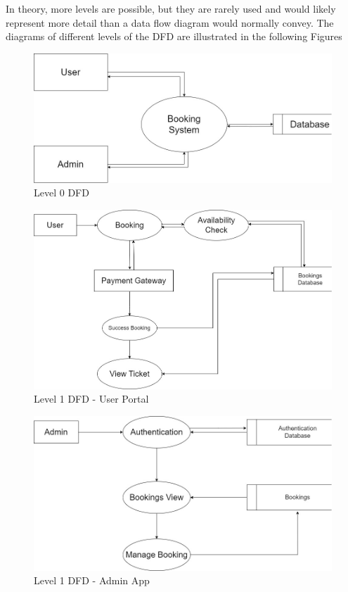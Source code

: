 \documentclass[12pt,a4paper]{report}
\begin{document}
In theory, more levels are possible, but they are rarely used and would likely represent more detail than a data flow diagram would normally convey. The diagrams of different levels of the DFD are illustrated in the following Figures
\begin{figure}[ht]
    \centering
    \includegraphics[width=\textwidth]{assets/DFD-1.jpg}
    \caption{Level 0 DFD}
    \label{dfd-1}
\end{figure}

\begin{figure}
    \centering
    \includegraphics[width=\textwidth]{assets/DFD-2-User.jpg}
    \caption{Level 1 DFD - User Portal}
    \label{dfd-2-user}
\end{figure}

\begin{figure}
    \centering
    \includegraphics[width=\textwidth]{assets/DFD-2-Admin.jpg}
    \caption{Level 1 DFD - Admin App}
    \label{dfd-2-admin}
\end{figure}
\clearpage
\end{document}
